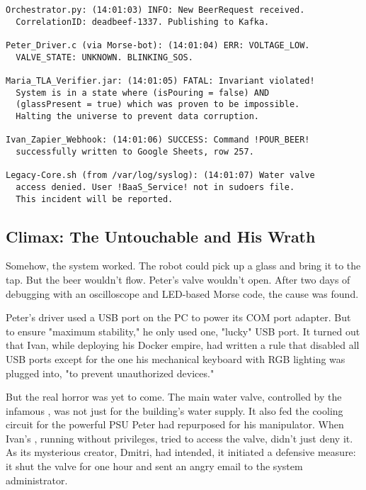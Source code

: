 \begin{verbatim}
Orchestrator.py: (14:01:03) INFO: New BeerRequest received. 
  CorrelationID: deadbeef-1337. Publishing to Kafka.

Peter_Driver.c (via Morse-bot): (14:01:04) ERR: VOLTAGE_LOW. 
  VALVE_STATE: UNKNOWN. BLINKING_SOS.

Maria_TLA_Verifier.jar: (14:01:05) FATAL: Invariant violated! 
  System is in a state where (isPouring = false) AND 
  (glassPresent = true) which was proven to be impossible. 
  Halting the universe to prevent data corruption.

Ivan_Zapier_Webhook: (14:01:06) SUCCESS: Command !POUR_BEER!
  successfully written to Google Sheets, row 257.

Legacy-Core.sh (from /var/log/syslog): (14:01:07) Water valve 
  access denied. User !BaaS_Service! not in sudoers file. 
  This incident will be reported.

\end{verbatim}





\subsection*{Climax: The Untouchable and His Wrath}

Somehow, the system worked. The robot could pick up a glass and bring it to the tap. But the beer wouldn't flow. Peter's valve wouldn't open. After two days of debugging with an oscilloscope and LED-based Morse code, the cause was found.

Peter's driver used a USB port on the PC to power its COM port adapter. But to ensure "maximum stability," he only used one, "lucky" USB port. It turned out that Ivan, while deploying his Docker empire, had written a  rule that disabled all USB ports except for the one his mechanical keyboard with RGB lighting was plugged into, "to prevent unauthorized devices."

But the real horror was yet to come. The main water valve, controlled by the infamous , was not just for the building's water supply. It also fed the cooling circuit for the powerful PSU Peter had repurposed for his manipulator. When Ivan's , running without privileges, tried to access the valve,  didn't just deny it. As its mysterious creator, Dmitri, had intended, it initiated a defensive measure: it shut the valve for one hour and sent an angry email to the system administrator.

